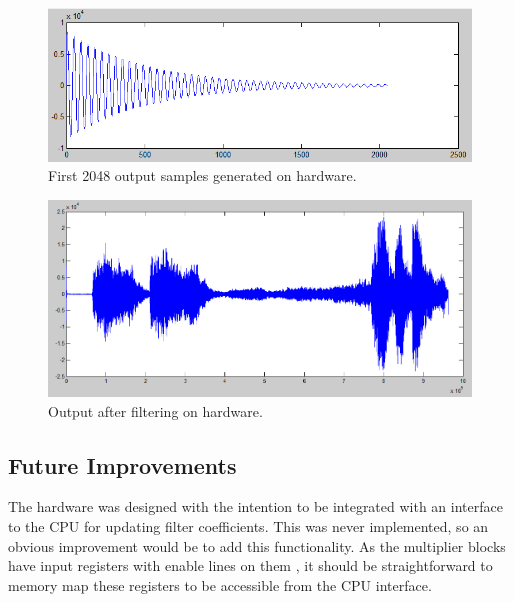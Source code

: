 \documentclass[]{article}
\begin{document}
\begin{figure}[p]
	\begin{center}
		\includegraphics[width = \textwidth]{initaldatabackfromboard.PNG}
	\end{center}
	\caption{First 2048 output samples generated on hardware.}
	\label{fig:short_hardware_output}
\end{figure}

\begin{figure}[p]
	\begin{center}
		\includegraphics[width = \textwidth]{Notch_filtered_from_hardware.PNG}
	\end{center}
	\caption{Output after filtering on hardware.}
	\label{fig:notch_output}
\end{figure}


\subsection{Future Improvements} %
\label{sub:future_improvements}

The hardware was designed with the intention to be integrated with an interface to the CPU for updating filter coefficients. This was never implemented, so an obvious improvement would be to add this functionality.
As the multiplier blocks have input registers with enable lines on them \cite{multipliers}, it should be straightforward to memory map these registers to be accessible from the CPU interface.
\end{document}
